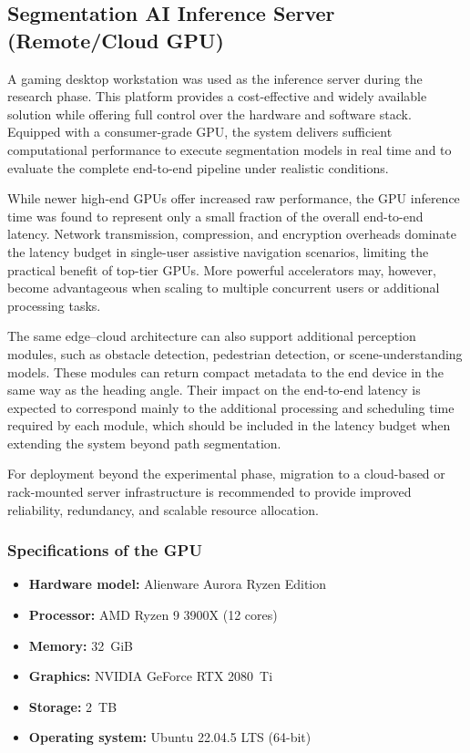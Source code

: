 \documentclass{ieeeaccess}
\begin{document}
\subsection{Segmentation AI Inference Server (Remote/Cloud GPU)}

A gaming desktop workstation was used as the inference server during the research phase. This platform provides a cost-effective and widely available solution while offering full control over the hardware and software stack. Equipped with a consumer-grade GPU, the system delivers sufficient computational performance to execute segmentation models in real time and to evaluate the complete end-to-end pipeline under realistic conditions.

While newer high-end GPUs offer increased raw performance, the GPU inference time was found to represent only a small fraction of the overall end-to-end latency. Network transmission, compression, and encryption overheads dominate the latency budget in single-user assistive navigation scenarios, limiting the practical benefit of top-tier GPUs. More powerful accelerators may, however, become advantageous when scaling to multiple concurrent users or additional processing tasks.

The same edge--cloud architecture can also support additional perception modules, such as obstacle detection, pedestrian detection, or scene-understanding models. These modules can return compact metadata to the end device in the same way as the heading angle. Their impact on the end-to-end latency is expected to correspond mainly to the additional processing and scheduling time required by each module, which should be included in the latency budget when extending the system beyond path segmentation.

For deployment beyond the experimental phase, migration to a cloud-based or rack-mounted server infrastructure is recommended to provide improved reliability, redundancy, and scalable resource allocation.

\subsubsection* {Specifications of the GPU}
\begin{itemize}
    \item \textbf{Hardware model:} Alienware Aurora Ryzen Edition
    \item \textbf{Processor:} AMD Ryzen 9 3900X (12 cores)
    \item \textbf{Memory:} 32~GiB
    \item \textbf{Graphics:} NVIDIA GeForce RTX 2080~Ti
    \item \textbf{Storage:} 2~TB
    \item \textbf{Operating system:} Ubuntu 22.04.5 LTS (64-bit)
\end{itemize}
\end{document}
